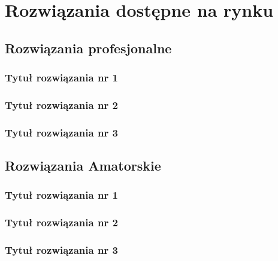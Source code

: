 \newpage
\section{Rozwiązania dostępne na rynku}

\subsection{Rozwiązania profesjonalne}
\subsubsection{Tytuł rozwiązania nr 1}
\subsubsection{Tytuł rozwiązania nr 2}
\subsubsection{Tytuł rozwiązania nr 3}

\subsection{Rozwiązania Amatorskie}
\subsubsection{Tytuł rozwiązania nr 1}
\subsubsection{Tytuł rozwiązania nr 2}
\subsubsection{Tytuł rozwiązania nr 3}